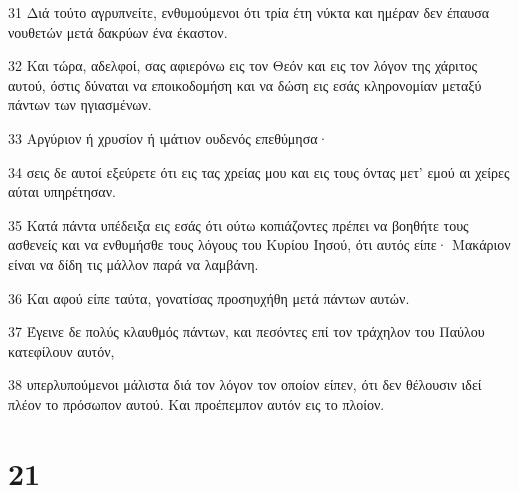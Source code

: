 \par 31 Διά τούτο αγρυπνείτε, ενθυμούμενοι ότι τρία έτη νύκτα και ημέραν δεν έπαυσα νουθετών μετά δακρύων ένα έκαστον.
\par 32 Και τώρα, αδελφοί, σας αφιερόνω εις τον Θεόν και εις τον λόγον της χάριτος αυτού, όστις δύναται να εποικοδομήση και να δώση εις εσάς κληρονομίαν μεταξύ πάντων των ηγιασμένων.
\par 33 Αργύριον ή χρυσίον ή ιμάτιον ουδενός επεθύμησα·
\par 34 σεις δε αυτοί εξεύρετε ότι εις τας χρείας μου και εις τους όντας μετ' εμού αι χείρες αύται υπηρέτησαν.
\par 35 Κατά πάντα υπέδειξα εις εσάς ότι ούτω κοπιάζοντες πρέπει να βοηθήτε τους ασθενείς και να ενθυμήσθε τους λόγους του Κυρίου Ιησού, ότι αυτός είπε· Μακάριον είναι να δίδη τις μάλλον παρά να λαμβάνη.
\par 36 Και αφού είπε ταύτα, γονατίσας προσηυχήθη μετά πάντων αυτών.
\par 37 Έγεινε δε πολύς κλαυθμός πάντων, και πεσόντες επί τον τράχηλον του Παύλου κατεφίλουν αυτόν,
\par 38 υπερλυπούμενοι μάλιστα διά τον λόγον τον οποίον είπεν, ότι δεν θέλουσιν ιδεί πλέον το πρόσωπον αυτού. Και προέπεμπον αυτόν εις το πλοίον.

\chapter{21}

